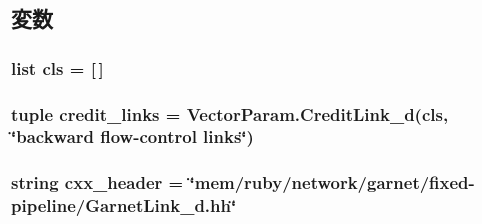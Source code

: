 \subsection{変数}
\hypertarget{classGarnetLink__d_1_1GarnetIntLink__d_ac7f071e45f9ddbded3db29efda614876}{
\subsubsection[{cls}]{\setlength{\rightskip}{0pt plus 5cm}list {\bf cls} = \mbox{[}$\,$\mbox{]}}}
\label{classGarnetLink__d_1_1GarnetIntLink__d_ac7f071e45f9ddbded3db29efda614876}
\hypertarget{classGarnetLink__d_1_1GarnetIntLink__d_a1cb258d6b6f19b0fe2d904ca97ebd474}{
\subsubsection[{credit\_\-links}]{\setlength{\rightskip}{0pt plus 5cm}tuple {\bf credit\_\-links} = VectorParam.CreditLink\_\-d({\bf cls}, \char`\"{}backward flow-\/control links\char`\"{})}}
\label{classGarnetLink__d_1_1GarnetIntLink__d_a1cb258d6b6f19b0fe2d904ca97ebd474}
\hypertarget{classGarnetLink__d_1_1GarnetIntLink__d_a17da7064bc5c518791f0c891eff05fda}{
\subsubsection[{cxx\_\-header}]{\setlength{\rightskip}{0pt plus 5cm}string {\bf cxx\_\-header} = \char`\"{}mem/ruby/network/garnet/fixed-\/pipeline/GarnetLink\_\-d.hh\char`\"{}}}
\label{classGarnetLink__d_1_1GarnetIntLink__d_a17da7064bc5c518791f0c891eff05fda}


